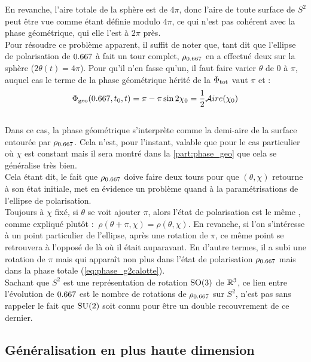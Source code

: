 En revanche, l'aire totale de la sphère est de $4\pi$, donc l'aire de toute surface de $S^2$ peut être vue comme étant définie modulo $4\pi$, ce qui n'est pas cohérent avec la phase géométrique, qui elle l'est à $2\pi$ près.
\\
Pour résoudre ce problème apparent, il suffit de noter que, tant dit que l’ellipse de polarisation de $\x$ à fait un tour complet, 
$\rho_{\x}$ en a effectué deux sur la sphère ($2\theta(t) = 4\pi$).
Pour qu'il n'en fasse qu'un, il faut faire varier $\theta$ de 0 à $\pi$, auquel cas le terme de la phase géométrique hérité de la $\Phi_{\text{\normalfont tot}}$ vaut $\pi$ et :
\begin{equation} \label{eq:phase_g2calotte}
	\phaseg(\x, t_0, t) = \pi - \pi\sin 2\chi_0 = \frac{1}{2}\mathcal{A}ire(\chi_0)
\end{equation}
\\
Dans ce cas, la phase géométrique s'interprète comme la demi-aire de la surface entourée par $\rho_{\x}$. Cela n'est, pour l'instant, valable que pour le cas particulier où $\chi$ est constant mais il sera montré dans la \cref{part:phase_geo} que cela se généralise très bien.
\\

Cela étant dit, le fait que $\rho_{\x}$ doive faire deux tours pour que $(\theta,\chi)$ retourne à son état initiale, met en évidence un problème quand à la paramétrisations de l'ellipse de polarisation.
\\
Toujours à $\chi$ fixé, si $\theta$ se voit ajouter $\pi$, alors l'état de polarisation est le même , comme expliqué plutôt : $\ \rho(\theta+\pi,\chi) = \rho(\theta, \chi)$.
En revanche, si l'on s'intéresse à un point particulier de l'ellipse, après une rotation de $\pi$, ce même point se retrouvera à l'opposé de là où il était auparavant. 
En d'autre termes, il a subi une rotation de $\pi$ mais qui apparaît non plus dans l'état de polarisation $\rho_{\x}$ mais dans la phase totale (\cref{eq:phase_g2calotte}).
\\
Sachant que $S^2$ est une représentation de rotation $\text{\normalfont SO}(3)$ de $\mathbb{R}^3$, ce lien entre l'évolution de $\x$ est le nombre de rotations de $\rho_{\x}$ sur $S^2$, n'est pas sans rappeler le fait que $\text{\normalfont SU}(2)$ soit connu pour être un double recouvrement de ce dernier.
\\




\subsection{\wip Généralisation en plus haute dimension} \label{subsec:aller_plus_loin}

